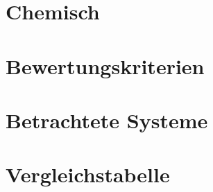 \section{Chemisch}
\cite{Lajunen20141}
\section{Bewertungskriterien} %
\section{Betrachtete Systeme} %
\section{Vergleichstabelle}   %